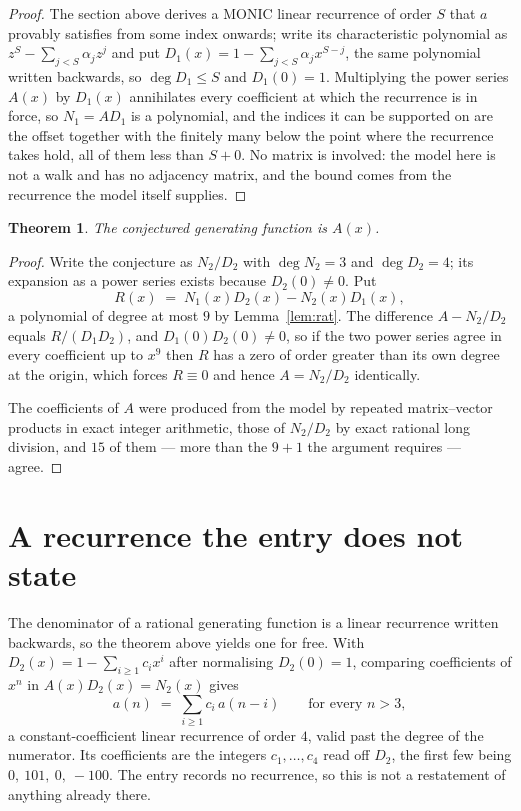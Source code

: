 \documentclass[11pt,a4paper]{article}
\theoremstyle{plain}
\newtheorem{theorem}{Theorem}
\theoremstyle{definition}
\begin{document}
\begin{proof}
The section above derives a MONIC linear recurrence of order $S$ that $a$ provably satisfies
from some index onwards; write its characteristic polynomial as $z^S-\sum_{j<S}\alpha_jz^j$
and put $D_1(x)=1-\sum_{j<S}\alpha_jx^{S-j}$, the same polynomial written backwards, so
$\deg D_1\le S$ and $D_1(0)=1$. Multiplying the power series $A(x)$ by $D_1(x)$ annihilates
every coefficient at which the recurrence is in force, so $N_1=AD_1$ is a polynomial, and the
indices it can be supported on are the offset together with the finitely many below the point
where the recurrence takes hold, all of them less than $S+0$. No matrix is involved: the
model here is not a walk and has no adjacency matrix, and the bound comes from the recurrence
the model itself supplies.
\end{proof}

\begin{theorem}
The conjectured generating function is $A(x)$.
\end{theorem}

\begin{proof}
Write the conjecture as $N_2/D_2$ with $\deg N_2=3$ and $\deg D_2=4$; its expansion as a
power series exists because $D_2(0)\neq0$. Put
\[
R(x)\;=\;N_1(x)D_2(x)-N_2(x)D_1(x),
\]
a polynomial of degree at most $9$ by Lemma~\ref{lem:rat}. The difference
$A-N_2/D_2$ equals $R/(D_1D_2)$, and $D_1(0)D_2(0)\neq0$, so if the two power series agree in
every coefficient up to $x^{9}$ then $R$ has a zero of order greater than its own
degree at the origin, which forces $R\equiv0$ and hence $A=N_2/D_2$ identically.

The coefficients of $A$ were produced from the model by repeated matrix--vector products in
exact integer arithmetic, those of $N_2/D_2$ by exact rational long division, and $15$
of them --- more than the $9+1$ the argument requires --- agree.
\end{proof}

\section{A recurrence the entry does not state}

The denominator of a rational generating function is a linear recurrence written backwards, so
the theorem above yields one for free. With $D_2(x)=1-\sum_{i\ge1}c_ix^i$ after normalising
$D_2(0)=1$, comparing coefficients of $x^n$ in $A(x)D_2(x)=N_2(x)$ gives
\[
a(n)\;=\;\sum_{i\ge1}c_i\,a(n-i)\qquad\text{for every }n>3,
\]
a constant-coefficient linear recurrence of order $4$, valid past the degree of the
numerator. Its coefficients are the integers $c_1,\dots,c_{4}$ read off $D_2$, the first few being $0,\ 101,\ 0,\ -100$. The entry records no recurrence, so this is not a restatement of anything
already there.
\end{document}
